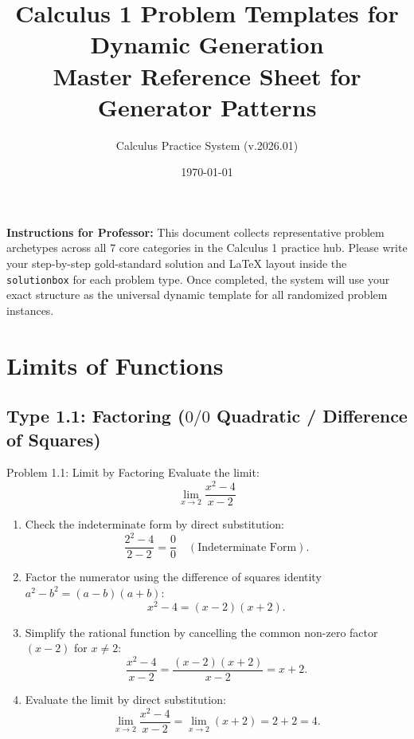 \documentclass[11pt,a4paper]{article}
\title{\textbf{Calculus 1 Problem Templates for Dynamic Generation}\\
\large Master Reference Sheet for Generator Patterns}
\author{Calculus Practice System (v.2026.01)}
\date{\today}
\begin{document}
\maketitle

\noindent\textbf{Instructions for Professor:}
This document collects representative problem archetypes across all 7 core categories in the Calculus 1 practice hub. Please write your step-by-step gold-standard solution and LaTeX layout inside the \texttt{solutionbox} for each problem type. Once completed, the system will use your exact structure as the universal dynamic template for all randomized problem instances.

\tableofcontents
\newpage

\section{Limits of Functions}

\subsection{Type 1.1: Factoring ($0/0$ Quadratic / Difference of Squares)}
\begin{problembox}{Problem 1.1: Limit by Factoring}
Evaluate the limit:
\[
\lim_{x \to 2} \frac{x^2 - 4}{x - 2}
\]
\end{problembox}
\begin{solutionbox}
\begin{enumerate}
	\item [Step 1.] Check the indeterminate form by direct substitution:
	\begin{equation*}
		\frac{2^2 - 4}{2 - 2} = \frac{0}{0} \quad (\text{Indeterminate Form}).
	\end{equation*}
	
	\item [Step 2.] Factor the numerator using the difference of squares identity $a^2 - b^2 = (a - b)(a + b)$:
	\begin{equation*}
		x^2 - 4 = (x - 2)(x + 2).
	\end{equation*}

	\item [Step 3.] Simplify the rational function by cancelling the common non-zero factor $(x - 2)$ for $x \neq 2$:
	\begin{equation*}
		\frac{x^2 - 4}{x - 2} = \frac{(x - 2)(x + 2)}{x - 2} = x + 2.
	\end{equation*}

	\item [Step 4.] Evaluate the limit by direct substitution:
	\begin{equation*}
		\lim_{x \to 2} \frac{x^2 - 4}{x - 2} = \lim_{x \to 2} (x + 2) = 2 + 2 = 4.
	\end{equation*}
\end{enumerate}
\end{solutionbox}
\end{document}
